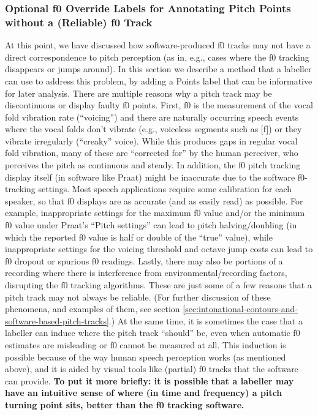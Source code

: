 \documentclass[11pt, twoside]{memoir}
\begin{document}
\subsubsection{Optional f0 Override Labels for Annotating Pitch Points without a (Reliable) f0 Track}\label{sec:optional-f0-override-labels-for-annotating-pitch-points-without-a-reliable-f0-track}
At this point, we have discussed how software-produced f0 tracks may not have a direct correspondence to pitch perception (as in, e.g., cases where the f0 tracking disappears or jumps around). In this section we describe a method that a labeller can use to address this problem, by adding a Points label that can be informative for later analysis.
There are multiple reasons why a pitch track may be discontinuous or display faulty f0 points. First, f0 is the measurement of the vocal fold vibration rate (“voicing”) and there are naturally occurring speech events where the vocal folds don’t vibrate (e.g., voiceless segments such as [f]) or they vibrate irregularly (“creaky” voice). While this produces gaps in regular vocal fold vibration, many of these are “corrected for” by the human perceiver, who perceives the pitch as continuous and steady.
In addition, the f0 pitch tracking display itself (in software like Praat) might be inaccurate due to the software f0-tracking settings. Most speech applications require some calibration for each speaker, so that f0 displays are as accurate (and as easily read) as possible. For example, inappropriate settings for the maximum f0 value and/or the minimum f0 value under Praat’s “Pitch settings” can lead to pitch halving\slash doubling (in which the reported f0 value is half or double of the “true” value), while inappropriate settings for the voicing threshold and octave jump costs can lead to f0 dropout or spurious f0 readings.
Lastly, there may also be portions of a recording where there is interference from environmental\slash recording factors, disrupting the f0 tracking algorithms.
These are just some of a few reasons that a pitch track may not always be reliable. (For further discussion of these phenomena, and examples of them, see section \ref{sec:intonational-contours-and-software-based-pitch-tracks}.) At the same time, it is sometimes the case that a labeller can induce where the pitch track “should” be, even when automatic f0 estimates are misleading or f0 cannot be measured at all. This induction is possible because of the way human speech perception works (as mentioned above), and it is aided by visual tools like (partial) f0 tracks that the software can provide. \textbf{To put it more briefly: it is possible that a labeller may have an intuitive sense of where (in time and frequency) a pitch turning point sits, better than the f0 tracking software.}
\end{document}
